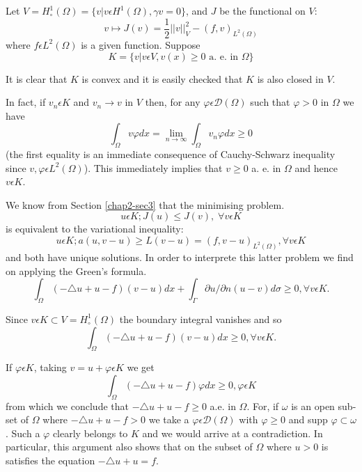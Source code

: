 \begin{example}\label{chap2-exam5.2}
Let $V = H_{\circ}^{1} (\Omega) = \{v | v \epsilon H^{1} (\Omega), \gamma v = 0\}$, and $J$ be the functional on $V$:
$$
v \mapsto J(v) = \frac{1}{2} ||v||_{V}^{2} - (f, v)_{L^{2} (\Omega)}
$$\pageoriginale
where $f \epsilon L^{2} (\Omega)$ is a given function. Suppose
\begin{equation*}
K = \{v | v \epsilon V, v(x) \geq 0 \text{ a. e. in }\Omega\}\tag{5.19}\label{chap2-eq5.19}
\end{equation*}
\end{example}

It is clear that $K$ is convex and it is easily checked that $K$ is also closed in $V$.

In fact, if $v_{n} \epsilon K$ and $v_{n} \to v$ in $V$ then, for any $\varphi \epsilon \mathscr{D} (\Omega)$ such that $\varphi > 0$ in $\Omega$ we have
$$
\int_{\Omega} v \varphi dx = \lim_{n \to \infty} \int_{\Omega} v_{n} \varphi dx \geq 0
$$
(the first equality is an immediate consequence of Cauchy-Schwarz inequality since $v, \varphi \epsilon L^{2}(\Omega)$). This immediately implies that $v \geq 0$ a. e. in $\Omega$ and hence $v \epsilon K$. 

We know from Section \ref{chap2-sec3} that the minimising problem.
\begin{equation*}
u \epsilon K ; J(u) \leq J(v), \; \forall v \epsilon K\tag{5.20}\label{chap2-eq5.20}
\end{equation*}
is equivalent to the variational inequality:
\begin{equation*}
u \epsilon K; a(u, v - u) \geq L(v-u) = (f, v-u)_{L^{2}(\Omega)}, \forall v \epsilon K\tag{5.21}\label{chap2-eq5.21}
\end{equation*}
and both have unique solutions. In order to interprete this latter problem we find on applying the Green's formula.
\begin{equation*}
\int_{\Omega} (-\triangle u + u-f)(v-u) dx + \int_{\Gamma} \partial u / \partial n(u-v) d\sigma \geq 0, \forall v \epsilon K.\tag{5.22}\label{chap2-eq5.22}
\end{equation*}

Since $v \epsilon K \subset V = H_{\circ}^{1} (\Omega)$ the boundary integral vanishes and so
\begin{equation*}
\int_{\Omega} (-\triangle u + u - f)(v-u)dx \geq 0, \forall v \epsilon K.\tag{5.23}\label{chap2-eq5.23}
\end{equation*}

If $\varphi \epsilon K$, taking $v = u + \varphi \epsilon K$ we get
$$
\int_{\Omega} (-\triangle u + u - f) \varphi dx \geq 0, \varphi \epsilon K
$$\pageoriginale
from which we conclude that $-\triangle u + u - f \geq 0$ a.e. in $\Omega$. For, if $\omega$ is an open sub-set of $\Omega$ where $-\triangle u + u - f > 0$ we take a $\varphi \epsilon \mathscr{D} (\Omega)$ with $\varphi \geq 0$ and supp $\varphi \subset \omega$. Such a $\varphi$ clearly belongs to $K$ and we would arrive at a contradiction. In particular, this argument also shows that on the subset of $\Omega$ where $u > 0$ is satisfies the equation $- \triangle u + u = f$.

